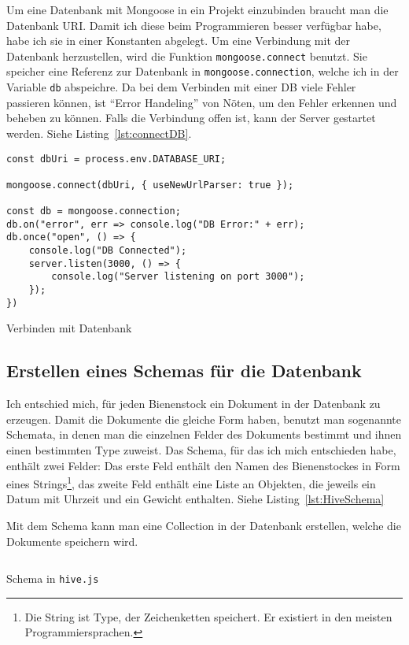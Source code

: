 \documentclass[a4paper, ngerman, 11pt]{scrartcl}
\newcommand{\js}[1]{\texttt{#1}}
\begin{document}
Um eine Datenbank mit Mongoose in ein Projekt einzubinden braucht man die Datenbank URI\@.
Damit ich diese beim Programmieren besser verfügbar habe, habe ich sie in einer Konstanten abgelegt.
Um eine Verbindung mit der Datenbank herzustellen, wird die Funktion \js{mongoose.connect} benutzt.
Sie speicher eine Referenz zur Datenbank in \js{mongoose.connection}, welche ich in der Variable \js{db} abspeichre.
Da bei dem Verbinden mit einer DB viele Fehler passieren können, ist \enquote{Error Handeling} von Nöten, um den Fehler erkennen und beheben zu können.
Falls die Verbindung offen ist, kann der Server gestartet werden. Siehe Listing~\ref{lst:connectDB}.
\begin{listing}[ht]
\centering
\begin{verbatim}
const dbUri = process.env.DATABASE_URI;

mongoose.connect(dbUri, { useNewUrlParser: true });

const db = mongoose.connection;
db.on("error", err => console.log("DB Error:" + err);
db.once("open", () => {
    console.log("DB Connected");
    server.listen(3000, () => {
        console.log("Server listening on port 3000");
    });
})
\end{verbatim}
\caption{Verbinden mit Datenbank\label{lst:connectDB}}
\end{listing}


\subsection{Erstellen eines Schemas für die Datenbank} %

Ich entschied mich, für jeden Bienenstock ein Dokument in der Datenbank zu erzeugen. Damit die Dokumente die gleiche Form haben, benutzt man sogenannte Schemata, in denen man die einzelnen Felder des Dokuments bestimmt und ihnen einen bestimmten Type zuweist. Das Schema, für das ich mich entschieden habe, enthält zwei Felder: Das erste Feld enthält den Namen des Bienenstockes in Form eines Strings\footnote{Die String ist Type, der Zeichenketten speichert. Er existiert in den meisten Programmiersprachen.}, das zweite Feld enthält eine Liste an Objekten, die jeweils ein Datum mit Uhrzeit und ein Gewicht enthalten. Siehe Listing~\ref{lst:HiveSchema}

Mit dem Schema kann man eine Collection in der Datenbank erstellen, welche die Dokumente speichern wird.

\begin{listing}[ht]
\inputminted{javascript}{../models/hive.js}
\caption{Schema in \texttt{hive.js}}\label{lst:HiveSchema}
\end{listing}
\end{document}
